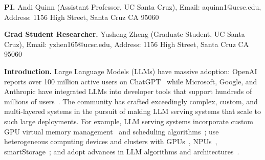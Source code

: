 \noindent \textbf{PI.} Andi Quinn (Assistant Professor, UC Santa Cruz), Email: aquinn1@ucsc.edu, Address: 1156 High Street, Santa Cruz CA 95060

\noindent \textbf{Grad Student Researcher.} Yusheng Zheng (Graduate Student, UC Santa Cruz), Email: yzhen165@ucsc.edu, Address: 1156 High Street, Santa Cruz CA 95060


\noindent \textbf{Introduction.}
Large Language Models (LLMs) have massive adoption: OpenAI reports over 100 million active users on ChatGPT~\cite{openai_2023} while Microsoft, Google, and Anthropic have integrated LLMs into developer tools that support hundreds of millions of users~\cite{mialon_2023, microsoft_2024, google_2024, anthropic_2024}.  The community has crafted exceedingly complex, custom, and multi-layered systems in the pursuit of making LLM serving systems that scale to such large deployments.  For example, LLM serving systems incorporate custom GPU virtual memory management~\cite{kwon2023pagedattention, li2023sglang, dao2022flashattention} and scheduling algorithms~\cite{kwon2023pagedattention}; use heterogeneous computing devices and clusters with GPUs~\cite{mei2025helix}, NPUs~\cite{heo2024neupims, xu2025llmnpu}, smartStorage~\cite{lu2024instinfer, cheops2025iochar}; and adopt advances in LLM algorithms and architectures~\cite{chen2023speculative, fedus2021switch, zhong2024distserve, micikevicius2022fp8, frantar2022gptq}.




